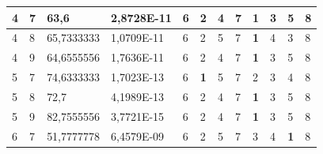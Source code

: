 \documentclass[conference]{IEEEtran}
\begin{document}
\begin{table}[]
\begin{tabular}{|llll|llllllll|}
		\multicolumn{1}{|l|}{4}   & \multicolumn{1}{l|}{7}         & \multicolumn{1}{l|}{63,6}          & 2,8728E-11 & \multicolumn{1}{l|}{6}   & \multicolumn{1}{l|}{2}          & \multicolumn{1}{l|}{4}          & \multicolumn{1}{l|}{7}   & \multicolumn{1}{l|}{\textbf{1}} & \multicolumn{1}{l|}{3}          & \multicolumn{1}{l|}{5}          & 8                      \\ \hline
		\multicolumn{1}{|l|}{4}   & \multicolumn{1}{l|}{8}         & \multicolumn{1}{l|}{65,7333333}    & 1,0709E-11 & \multicolumn{1}{l|}{6}   & \multicolumn{1}{l|}{2}          & \multicolumn{1}{l|}{5}          & \multicolumn{1}{l|}{7}   & \multicolumn{1}{l|}{\textbf{1}} & \multicolumn{1}{l|}{4}          & \multicolumn{1}{l|}{3}          & 8                      \\ \hline
		\multicolumn{1}{|l|}{4}   & \multicolumn{1}{l|}{9}         & \multicolumn{1}{l|}{64,6555556}    & 1,7636E-11 & \multicolumn{1}{l|}{6}   & \multicolumn{1}{l|}{2}          & \multicolumn{1}{l|}{4}          & \multicolumn{1}{l|}{7}   & \multicolumn{1}{l|}{\textbf{1}} & \multicolumn{1}{l|}{3}          & \multicolumn{1}{l|}{5}          & 8                      \\ \hline
		\multicolumn{1}{|l|}{5}   & \multicolumn{1}{l|}{7}         & \multicolumn{1}{l|}{74,6333333}    & 1,7023E-13 & \multicolumn{1}{l|}{6}   & \multicolumn{1}{l|}{\textbf{1}} & \multicolumn{1}{l|}{5}          & \multicolumn{1}{l|}{7}   & \multicolumn{1}{l|}{2}          & \multicolumn{1}{l|}{3}          & \multicolumn{1}{l|}{4}          & 8                      \\ \hline
		\multicolumn{1}{|l|}{5}   & \multicolumn{1}{l|}{8}         & \multicolumn{1}{l|}{72,7}          & 4,1989E-13 & \multicolumn{1}{l|}{6}   & \multicolumn{1}{l|}{2}          & \multicolumn{1}{l|}{4}          & \multicolumn{1}{l|}{7}   & \multicolumn{1}{l|}{\textbf{1}} & \multicolumn{1}{l|}{3}          & \multicolumn{1}{l|}{5}          & 8                      \\ \hline
		\multicolumn{1}{|l|}{5}   & \multicolumn{1}{l|}{9}         & \multicolumn{1}{l|}{82,7555556}    & 3,7721E-15 & \multicolumn{1}{l|}{6}   & \multicolumn{1}{l|}{2}          & \multicolumn{1}{l|}{4}          & \multicolumn{1}{l|}{7}   & \multicolumn{1}{l|}{\textbf{1}} & \multicolumn{1}{l|}{3}          & \multicolumn{1}{l|}{5}          & 8                      \\ \hline
		\multicolumn{1}{|l|}{6}   & \multicolumn{1}{l|}{7}         & \multicolumn{1}{l|}{51,7777778}    & 6,4579E-09 & \multicolumn{1}{l|}{6}   & \multicolumn{1}{l|}{2}          & \multicolumn{1}{l|}{5}          & \multicolumn{1}{l|}{7}   & \multicolumn{1}{l|}{3}          & \multicolumn{1}{l|}{4}          & \multicolumn{1}{l|}{\textbf{1}} & 8                      \\ \hline

\end{tabular}
\end{table}
\end{document}
